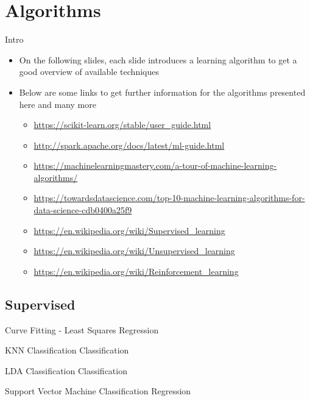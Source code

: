 \section{Algorithms}
  \begin{frame}{Intro}
    \begin{itemize}
      \item On the following slides, each slide introduces a learning algorithm to get a good overview of available techniques
      \item Below are some links to get further information for the algorithms presented here and many more
      \begin{itemize}
        \item \url{https://scikit-learn.org/stable/user_guide.html}
        \item \url{http://spark.apache.org/docs/latest/ml-guide.html}
        \item \url{https://machinelearningmastery.com/a-tour-of-machine-learning-algorithms/}
        \item \url{https://towardsdatascience.com/top-10-machine-learning-algorithms-for-data-science-cdb0400a25f9}
        \item \url{https://en.wikipedia.org/wiki/Supervised_learning}
        \item \url{https://en.wikipedia.org/wiki/Unsupervised_learning}
        \item \url{https://en.wikipedia.org/wiki/Reinforcement_learning}
      \end{itemize}
    \end{itemize}
  \end{frame}

  \subsection{Supervised}

  \begin{frame}{Curve Fitting - Least Squares}
  Regression
  \end{frame}

  \begin{frame}{KNN Classification}
  Classification
  \end{frame}

  \begin{frame}{LDA Classification}
  Classification
  \end{frame}

  \begin{frame}{Support Vector Machine}
  Classification
  Regression
  \end{frame}

